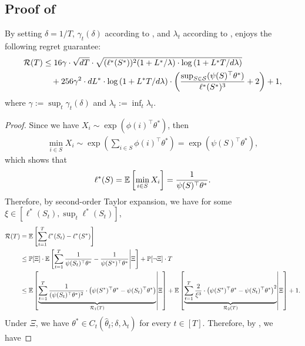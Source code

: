 \subsection{Proof of }
\begin{theorem}
\label{thm:kminexp-formal}
By setting $\delta = 1/T$, $\gamma_t(\delta)$ according to , and $\lambda_t$ according to ,  enjoys the following regret guarantee: 
\begin{align*}
    {\mathcal{R}}(T) &\le 
    16\gamma \cdot \sqrt{dT}\cdot \sqrt{(\ell^*(S^*))^2(1 + L^*/\lambda) \cdot \log\left(1 + L^*T/d\lambda\right)} \\
    &\quad + 256\gamma^2 \cdot dL^* \cdot \log\left(1 + L^*T/d\lambda\right) \cdot \left(\frac{\sup_{S \in {\mathcal{S}}} (\psi(S)^\top \theta^*)}{\ell^*(S^*)^3} + 2\right) + 1,
\end{align*}
where $\gamma := \sup_t \gamma_t(\delta)$ and $\lambda_t := \inf_t \lambda_t$.
\begin{proof}
Since we have $X_i \sim \exp(\phi(i)^\top \theta^*)$, then
\begin{align*}
    \min_{i \in S} X_i \sim \exp\left(\sum_{i \in S} \phi(i)^\top \theta^* \right) = \exp\left(\psi(S)^\top \theta^* \right),
\end{align*}
which shows that 
\begin{align*}
    \ell^*(S) = \mathbb{E}\left[\min_{i \in S} X_i\right] = \frac{1}{\psi(S)^\top \theta^*}.
\end{align*}
Therefore, by second-order Taylor expansion, we have for some $\xi \in [\ell^*(S_t), \sup_t \ell^*(S_t)]$, 
\begin{align*}
    {\mathcal{R}}(T) &= \mathbb{E}\left[\sum_{t=1}^T \ell^*(S_t) - \ell^*(S^*) \right]\\
    &\le   {\mathbb{P}}[\Xi] \cdot \mathbb{E}\left[\sum_{t=1}^T \frac{1}{\psi(S_t)^\top \theta^*} - \frac{1}{\psi(S^*)^\top \theta^*} \middle| \Xi \right]+ {\mathbb{P}}[\neg\Xi] \cdot T \\
    &\le \mathbb{E}\left[ \underbrace{\sum_{t=1}^T \frac{1}{(\psi(S_t)^\top \theta^*)^2} \cdot \left( \psi(S^*)^\top \theta^* - \psi(S_t)^\top \theta^*  \right)}_{{\mathcal{R}}_1(T)} \middle| \Xi \right] +\mathbb{E}\left[ \underbrace{\sum_{t=1}^T \frac{2}{\xi^3} \cdot \left(\psi(S^*)^\top \theta^* - \psi(S_t)^\top \theta^* \right)^2 }_{{\mathcal{R}}_2(T)} \middle| \Xi \right] + 1.
\end{align*}
Under $\Xi$, we have $\theta^* \in C_t(\hat\theta_t; \delta, \lambda_t)$ for every $t \in [T]$. Therefore, by , we have

\end{proof}
\end{theorem}
